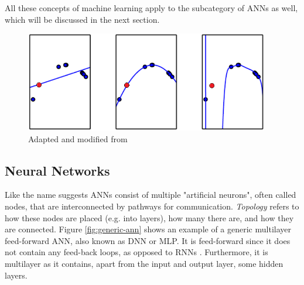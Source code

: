 All these concepts of machine learning apply to the subcategory of \acp{ANN} as well, which will be discussed in the next section.




\begin{figure}[ht]
    \centering
    \includegraphics[width=0.95\textwidth]{img/overfitting-vs-underfitting}
    \caption{Adapted and modified from \cite[Fig. 5.2]{Goodfellow2016}}
    \label{fig:over-vs-under}
\end{figure}

\subsection{Neural Networks}
Like the name suggests \acp{ANN} consist of multiple "artificial neurons", often called nodes, that are interconnected by pathways for communication.
\textit{Topology} refers to how these nodes are placed (e.g. into layers), how many there are, and how they are connected.
Figure \ref{fig:generic-ann} shows an example of a generic multilayer feed-forward \ac{ANN}, also known as \ac{DNN} or \ac{MLP}.
It is feed-forward since it does not contain any feed-back loops, as opposed to \acp{RNN} \cite{Goodfellow2016, Haykin2009}. Furthermore, it is multilayer as it contains, apart from the input and output layer, some hidden layers.

